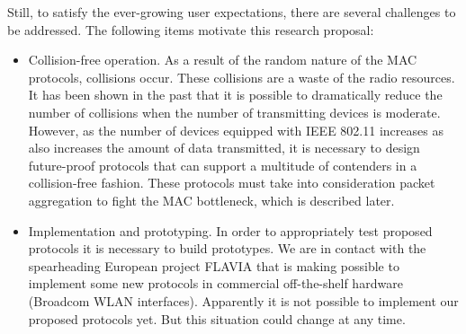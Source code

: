 \documentclass[a4paper,twocolumns]{article}%
\begin{document}
Still, to satisfy the ever-growing user expectations, there are several challenges to be addressed.
The following items motivate this research proposal:
\begin{itemize}
\item Collision-free operation.
As a result of the random nature of the MAC protocols, collisions occur.
These collisions are a  waste of the radio resources.
It has been shown in the past that it is possible to dramatically reduce the number of collisions when the number of transmitting devices is moderate.
However, as the number of devices equipped with IEEE 802.11 increases as also increases the amount of data transmitted, it is necessary to design future-proof protocols that can support a multitude of contenders in a collision-free fashion.
These protocols must take into consideration packet aggregation to fight the MAC bottleneck, which is described later.
\item Implementation and prototyping.
In order to appropriately test proposed protocols it is necessary to build prototypes.
We are in contact with the spearheading European project FLAVIA that is making possible to implement some new protocols in commercial off-the-shelf hardware (Broadcom WLAN interfaces).
Apparently it is not possible to implement our proposed protocols yet.
But this situation could change at any time.


\end{itemize}
\end{document}
